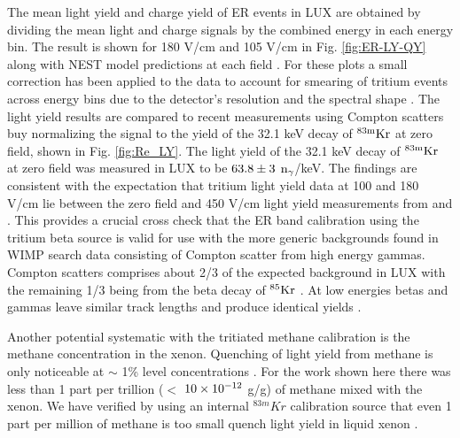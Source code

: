 The mean light yield and charge yield of ER events in LUX are obtained by dividing the mean light and charge signals by the combined energy in each energy bin. The result is shown for 180 V/cm and 105 V/cm in Fig. \ref{fig:ER-LY-QY} along with NEST model predictions at each field \cite{NEST_2013}. For these plots a small correction has been applied to the data to account for smearing of tritium events across energy bins due to the detector's resolution and the spectral shape \cite{Dobi_Thesis}. 
The light yield results are compared to recent measurements using Compton scatters buy normalizing the signal to the yield of the 32.1 keV decay of $\rm ^{83m}Kr$ at zero field, shown in Fig. \ref{fig:Re_LY}. The light yield of the 32.1 keV decay of $\rm ^{83m}Kr$ at zero field was measured in LUX to be $\rm 63.8 \pm 3$ $\rm n_\gamma$/keV.  The findings are consistent with the expectation that tritium light yield data at 100 and 180 V/cm lie between the zero field and 450 V/cm light yield measurements from \cite{Aprile_LY} and \cite{Baudis}. This provides a crucial cross check that the ER band calibration using the tritium beta source is valid for use with the more generic backgrounds found in WIMP search data consisting of Compton scatter from high energy gammas. Compton scatters comprises about 2/3 of the expected background in LUX with the remaining 1/3 being from the beta decay of $\rm ^{85}Kr$ \cite{LUX_BG}. At low energies betas and gammas leave similar track lengths and produce identical yields \cite{NEST} \cite{NEST_2013}. 

Another potential systematic with the tritiated methane calibration is the methane concentration in the xenon. Quenching of light yield from methane is only noticeable at $\sim$ 1\% level concentrations \cite{Kirill_Methane}. For the work shown here there was less than 1 part per trillion ($<$ $\rm10\times10^{-12}$ g/g) of methane mixed with the xenon. We have verified by using an internal $^{83m}Kr$ calibration source that even 1 part per million of methane is too small quench light yield in liquid xenon \cite{Dobi_Thesis}.


